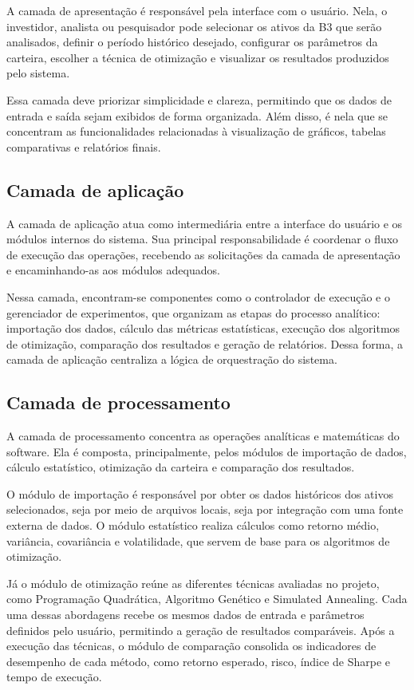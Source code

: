 \documentclass[
	12pt,				%
	openright,			%
	oneside,			    %
	a4paper,				%
	english,			%
	french,			%
	spanish,			%
	brazil			%
	]{abntex2}
\begin{document}
A camada de apresentação é responsável pela interface com o usuário. Nela, o investidor, analista ou pesquisador pode selecionar os ativos da B3 que serão analisados, definir o período histórico desejado, configurar os parâmetros da carteira, escolher a técnica de otimização e visualizar os resultados produzidos pelo sistema.

Essa camada deve priorizar simplicidade e clareza, permitindo que os dados de entrada e saída sejam exibidos de forma organizada. Além disso, é nela que se concentram as funcionalidades relacionadas à visualização de gráficos, tabelas comparativas e relatórios finais.

\subsection{Camada de aplicação}

A camada de aplicação atua como intermediária entre a interface do usuário e os módulos internos do sistema. Sua principal responsabilidade é coordenar o fluxo de execução das operações, recebendo as solicitações da camada de apresentação e encaminhando-as aos módulos adequados.

Nessa camada, encontram-se componentes como o controlador de execução e o gerenciador de experimentos, que organizam as etapas do processo analítico: importação dos dados, cálculo das métricas estatísticas, execução dos algoritmos de otimização, comparação dos resultados e geração de relatórios. Dessa forma, a camada de aplicação centraliza a lógica de orquestração do sistema.

\subsection{Camada de processamento}

A camada de processamento concentra as operações analíticas e matemáticas do software. Ela é composta, principalmente, pelos módulos de importação de dados, cálculo estatístico, otimização da carteira e comparação dos resultados.

O módulo de importação é responsável por obter os dados históricos dos ativos selecionados, seja por meio de arquivos locais, seja por integração com uma fonte externa de dados. O módulo estatístico realiza cálculos como retorno médio, variância, covariância e volatilidade, que servem de base para os algoritmos de otimização.

Já o módulo de otimização reúne as diferentes técnicas avaliadas no projeto, como Programação Quadrática, Algoritmo Genético e Simulated Annealing. Cada uma dessas abordagens recebe os mesmos dados de entrada e parâmetros definidos pelo usuário, permitindo a geração de resultados comparáveis. Após a execução das técnicas, o módulo de comparação consolida os indicadores de desempenho de cada método, como retorno esperado, risco, índice de Sharpe e tempo de execução.
\end{document}
